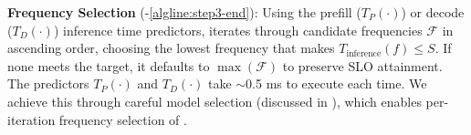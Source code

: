  \textbf{Frequency Selection} (-\ref{algline:step3-end}):
Using the prefill ($T_P(\cdot)$) or decode ($T_D(\cdot)$) inference time predictors, \governor iterates through candidate frequencies $\mathcal{F}$ in ascending order, choosing the lowest frequency that makes $T_{\text{inference}}(f) \le S$.
If none meets the target, it defaults to $\max(\mathcal{F})$ to preserve SLO attainment.
The predictors $T_P(\cdot)$ and $T_D(\cdot)$ take $\sim$0.5 ms to execute each time.
We achieve this through careful model selection (discussed in ), which enables per-iteration frequency selection of \governor.



